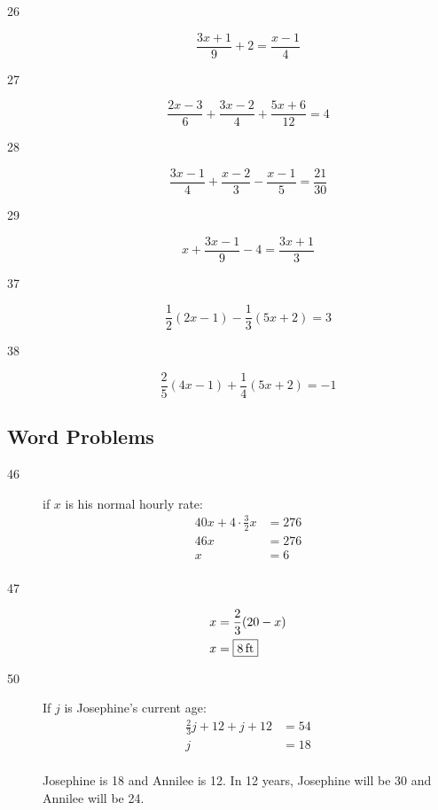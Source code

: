 \documentclass[letterpaper, landscape]{exam}
\begin{document}
\begin{description}
    \item[26]
      \[
        \frac{3x + 1}{9} + 2 = \frac{x - 1}{4}
      \]

    \item[27]
      \[
        \frac{2x - 3}{6} + \frac{3x - 2}{4} + \frac{5x + 6}{12} = 4
      \]

    \item[28]
      \[
        \frac{3x - 1}{4} + \frac{x - 2}{3} - \frac{x - 1}{5} = \frac{21}{30}
      \]

    \item[29]
      \[
        x + \frac{3x - 1}{9} - 4 = \frac{3x + 1}{3}
      \]

    \item[37]
      \[
        \frac{1}{2} (2x - 1) - \frac{1}{3} (5x + 2) = 3
      \]

    \item[38]
      \[
        \frac{2}{5} (4x - 1) + \frac{1}{4} (5x + 2) = -1
      \]

  \end{description}

  \subsection{Word Problems} %

  \begin{description}
      
    \item[46]
      if $x$ is his normal hourly rate:
      \begin{align*}
        40x + 4 \cdot \frac{3}{2} x & = 276 \\
        46x                         & = 276 \\
        x                           & = \boxed{ 6 } \\
      \end{align*}

    \item[47]
      \begin{align*}
        x & = \frac{2}{3} (20 - x) \\
        x & = \boxed{ \unit[8]{ft} } \\
      \end{align*}

    \item[50]
      If $j$ is Josephine's current age:
      \begin{align*}
        \frac{2}{3} j + 12 + j + 12 & = 54 \\
        j                           & = 18 \\
      \end{align*}

      Josephine is 18 and Annilee is 12. In 12 years, Josephine will be 30 and
      Annilee will be 24.

  \end{description}
\end{document}
